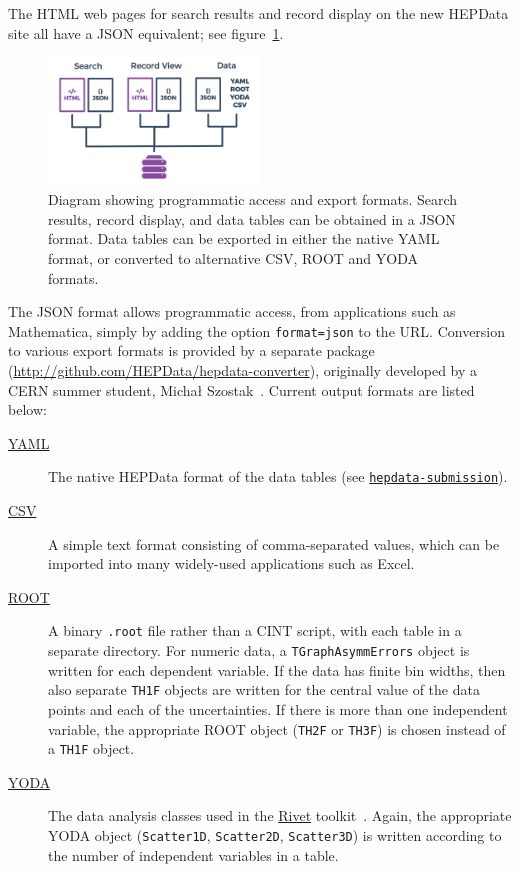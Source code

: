 \documentclass[a4paper]{jpconf}
\begin{document}
The HTML web pages for search results and record display on the new HEPData site all have a JSON equivalent; see figure~\ref{fig:programmatic}.
%
\begin{figure}
  \begin{center}
    \includegraphics[width=0.5\textwidth]{Figures/programmatic_content.pdf}\hspace{2pc}%
    \begin{minipage}[b]{14pc}
      \caption{\label{fig:programmatic}Diagram showing programmatic access and export formats.  Search results, record display, and data tables can be obtained in a JSON format.  Data tables can be exported in either the native YAML format, or converted to alternative CSV, ROOT and YODA formats.}
    \end{minipage}
  \end{center}
\end{figure}
%
The JSON format allows programmatic access, from applications such as Mathematica, simply by adding the option \texttt{format=json} to the URL.  Conversion to various export formats is provided by a separate package (\url{http://github.com/HEPData/hepdata-converter}), originally developed by a CERN summer student, Micha\l{} Szostak~\cite{Szostak:2055193}.  Current output formats are listed below:
%
\begin{description}
\item [\href{http://yaml.org}{YAML}] The native HEPData format of the data tables (see \href{http://github.com/HEPData/hepdata-submission}{\texttt{hepdata-submission}}).
\item [\href{https://en.wikipedia.org/wiki/Comma-separated_values}{CSV}] A simple text format consisting of comma-separated values, which can be imported into many widely-used applications such as Excel.
\item [\href{https://root.cern.ch}{ROOT}] A binary \texttt{.root} file rather than a CINT script, with each table in a separate directory.  For numeric data, a \texttt{TGraphAsymmErrors} object is written for each dependent variable.  If the data has finite bin widths, then also separate \texttt{TH1F} objects are written for the central value of the data points and each of the uncertainties.  If there is more than one independent variable, the appropriate ROOT object (\texttt{TH2F} or \texttt{TH3F}) is chosen instead of a \texttt{TH1F} object.
\item [\href{https://yoda.hepforge.org}{YODA}] The data analysis classes used in the \href{https://rivet.hepforge.org}{Rivet} toolkit~\cite{Buckley:2010ar}.  Again, the appropriate YODA object (\texttt{Scatter1D}, \texttt{Scatter2D}, \texttt{Scatter3D}) is written according to the number of independent variables in a table.
\end{description}
\end{document}
